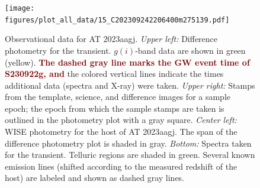 \documentclass[twocolumn]{aastex631}
\newcommand{\response}[1]{\textbf{\textcolor{maroon}{#1}}}
\begin{document}
\begin{figure}
    \centering
    \texttt{[image: figures/plot\_all\_data/15\_C202309242206400m275139.pdf]}
    \caption{
        Observational data for AT 2023aagj.
        \textit{Upper left:} Difference photometry for the transient.
        $g(i)$-band data are shown in green (yellow). %
        \response{The dashed gray line marks the GW event time of S230922g, and} the colored vertical lines indicate the times additional data (spectra and X-ray) were taken.
        \textit{Upper right:} Stamps from the template, science, and difference images for a sample epoch; the epoch from which the sample stamps are taken is outlined in the photometry plot with a gray square.
        \textit{Center left:}
        WISE photometry for the host of AT 2023aagj.
        The span of the difference photometry plot is shaded in gray.
        \textit{Bottom:} Spectra taken for the transient.
        Telluric regions are shaded in green.
        Several known emission lines (shifted according to the measured redshift of the host) are labeled and shown as dashed gray lines.
    }
    \label{fig:C202309242206400m275139}
\end{figure}
\end{document}

